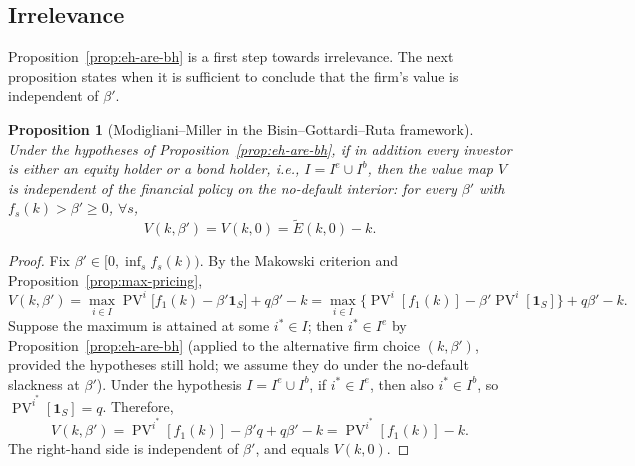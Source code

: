 \documentclass[11pt,a4paper,oneside]{book}
\def\1{\mathbf{1}}
\def\geq{\geqslant}
\DeclareMathOperator{\PV}{PV}
\theoremstyle{plain}
\newtheorem{proposition}[theorem]{Proposition}
\theoremstyle{definition}
\theoremstyle{remark}
\numberwithin{equation}{chapter}
\begin{document}
\subsection{Irrelevance}

Proposition~\ref{prop:eh-are-bh} is a first step towards irrelevance.
The next proposition states when it is sufficient to conclude that the firm's value is independent of $\beta'$.

\begin{proposition}[Modigliani--Miller in the Bisin--Gottardi--Ruta framework]\label{prop:mm-BGR}
Under the hypotheses of Proposition~\ref{prop:eh-are-bh}, if in addition every investor is either an equity holder or a bond holder, i.e., $I = I^e \cup I^b$, then the value map $V$ is independent of the financial policy on the no-default interior: for every $\beta'$ with $f_s(k) > \beta' \geq 0$, $\forall s$,
\begin{equation*}
  V(k, \beta') = V(k, 0) = \widetilde{E}(k, 0) - k.
\end{equation*}
\end{proposition}

\begin{proof}
Fix $\beta' \in [0, \inf_s f_s(k))$.
By the Makowski criterion and Proposition~\ref{prop:max-pricing},
\begin{equation*}
  V(k, \beta') = \max_{i \in I} \PV^i\bigl[ f_1(k) - \beta' \1_S \bigr] + q \beta' - k
  = \max_{i \in I} \bigl\{ \PV^i[f_1(k)] - \beta' \PV^i[\1_S] \bigr\} + q \beta' - k.
\end{equation*}
Suppose the maximum is attained at some $i^\ast \in I$; then $i^\ast \in I^e$ by Proposition~\ref{prop:eh-are-bh} (applied to the alternative firm choice $(k, \beta')$, provided the hypotheses still hold; we assume they do under the no-default slackness at $\beta'$).
Under the hypothesis $I = I^e \cup I^b$, if $i^\ast \in I^e$, then also $i^\ast \in I^b$, so $\PV^{i^\ast}[\1_S] = q$.
Therefore,
\begin{equation*}
  V(k, \beta') = \PV^{i^\ast}[f_1(k)] - \beta' q + q \beta' - k = \PV^{i^\ast}[f_1(k)] - k.
\end{equation*}
The right-hand side is independent of $\beta'$, and equals $V(k, 0)$.
\end{proof}
\end{document}
